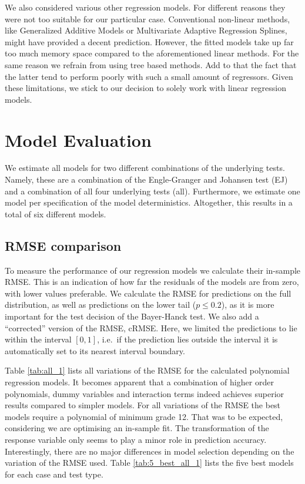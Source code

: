 \documentclass[12pt,a4paper]{article}
\begin{document}
We also considered various other regression models. For different
reasons they were not too suitable for our particular case. Conventional
non-linear methods, like Generalized Additive Models or Multivariate
Adaptive Regression Splines, might have provided a decent prediction.
However, the fitted models take up far too much memory space compared to
the aforementioned linear methods. For the same reason we refrain from
using tree based methods. Add to that the fact that the latter tend to
perform poorly with such a small amount of regressors. Given these
limitations, we stick to our decision to solely work with linear
regression models.

\hypertarget{model-evaluation}{%
\section{Model Evaluation}\label{model-evaluation}}

We estimate all models for two different combinations of the underlying
tests. Namely, these are a combination of the Engle-Granger and Johansen
test (EJ) and a combination of all four underlying tests (all).
Furthermore, we estimate one model per specification of the model
deterministics. Altogether, this results in a total of six different
models.

\hypertarget{rmse-comparison}{%
\subsection{RMSE comparison}\label{rmse-comparison}}

To measure the performance of our regression models we calculate their
in-sample RMSE. This is an indication of how far the residuals of the
models are from zero, with lower values preferable. We calculate the
RMSE for predictions on the full distribution, as well as predictions on
the lower tail (\(p \leq 0.2\)), as it is more important for the test
decision of the Bayer-Hanck test. We also add a ``corrected'' version of
the RMSE, cRMSE. Here, we limited the predictions to lie within the
interval \([0, 1]\), i.e.~if the prediction lies outside the interval it
is automatically set to its nearest interval boundary.

Table \ref{tab:all_1} lists all variations of the RMSE for the
calculated polynomial regression models. It becomes apparent that a
combination of higher order polynomials, dummy variables and interaction
terms indeed achieves superior results compared to simpler models. For
all variations of the RMSE the best models require a polynomial of
minimum grade 12. That was to be expected, considering we are optimising
an in-sample fit. The transformation of the response variable only seems
to play a minor role in prediction accuracy. Interestingly, there are no
major differences in model selection depending on the variation of the
RMSE used. Table \ref{tab:5_best_all_1} lists the five best models for
each case and test type.
\end{document}

